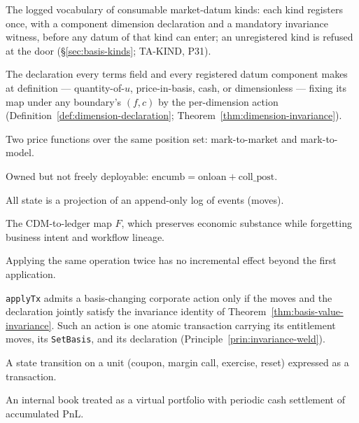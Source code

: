 \begin{description}[style=nextline]
\item[Datum-kind registry] The logged vocabulary of consumable market-datum kinds: each kind registers once, with a component dimension declaration and a mandatory invariance witness, before any datum of that kind can enter; an unregistered kind is refused at the door (\S\ref{sec:basis-kinds}; TA-KIND, P31).

\item[Dimension declaration] The declaration every terms field and every registered datum component makes at definition --- quantity-of-$u$, price-in-basis, cash, or dimensionless --- fixing its map under any boundary's $(f,c)$ by the per-dimension action (Definition~\ref{def:dimension-declaration}; Theorem~\ref{thm:dimension-invariance}).

\item[Dual valuation] Two price functions over the same position set: mark-to-market and mark-to-model.

\item[Encumbrance] Owned but not freely deployable: $\mathrm{encumb}=\mathrm{onloan}+\mathrm{coll\_post}$.

\item[Event sourcing] All state is a projection of an append-only log of events (moves).

\item[Forgetful mapping] The CDM-to-ledger map $F$, which preserves economic substance while forgetting business intent and workflow lineage.

\item[Idempotency] Applying the same operation twice has no incremental effect beyond the first application.

\item[Invariance weld] \texttt{applyTx} admits a basis-changing corporate action only if the moves and the declaration jointly satisfy the invariance identity of Theorem~\ref{thm:basis-value-invariance}. Such an action is one atomic transaction carrying its entitlement moves, its \texttt{SetBasis}, and its declaration (Principle~\ref{prin:invariance-weld}).

\item[Lifecycle event] A state transition on a unit (coupon, margin call, exercise, reset) expressed as a transaction.

\item[Managed account] An internal book treated as a virtual portfolio with periodic cash settlement of accumulated PnL.


\end{description}
